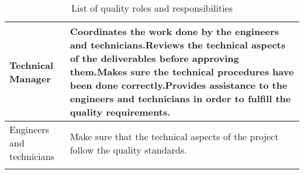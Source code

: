 \begin{longtable}[H]{>{\raggedright\arraybackslash}p{5cm} p{9cm}}
	\midrule
	
	Technical Manager & Coordinates the work done by the engineers and technicians.\vspace{0.3cm}\newline Reviews the technical aspects of the deliverables before approving them.\vspace{0.3cm}\newline Makes sure the technical procedures have been done correctly.\vspace{0.3cm}\newline Provides assistance to the engineers and technicians in order to fulfill the quality requirements.\vspace{0.2cm} \\
	
	\midrule
	
	Engineers and technicians & Make sure that the technical aspects of the project follow the quality standards.\vspace{0.2cm} \\
	
	\bottomrule[2pt]
	
	\caption{List of quality roles and responsibilities}
	
\end{longtable}